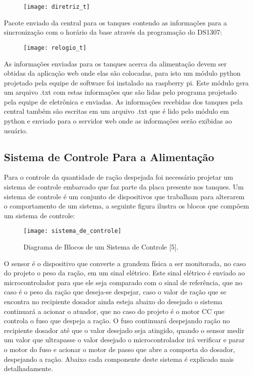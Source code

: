 \begin{figure}[!h]
\centering \texttt{[image: diretriz\_t]}
\label{diretriz_t}
\end{figure}

Pacote enviado da central para os tanques contendo as informações para a sincronização com o horário da base através da programação do DS1307:

\begin{figure}[!h]
\centering \texttt{[image: relogio\_t]}
\label{relogio_t}
\end{figure}

As informações enviadas para os tanques acerca da alimentação devem ser obtidas da aplicação web onde elas são colocadas, para isto um módulo python projetado pela equipe de software foi instalado na raspberry pi. Este módulo gera um arquivo .txt com estas informações que são lidas pelo programa projetado pela equipe de eletrônica e enviadas. As informações recebidas dos tanques pela central também são escritas em um arquivo .txt que é lido pelo módulo em python e enviado para o servidor web onde as informações serão exibidas ao usuário.

\subsection{Sistema de Controle Para a Alimentação}

Para o controle da quantidade de ração despejada foi necessário projetar um sistema de controle embarcado que faz parte da placa presente nos tanques. Um sistema de controle é um conjunto de dispositivos que trabalham para alterarem o comportamento de um sistema, a seguinte figura ilustra os blocos que compõem um sistema de controle:

\begin{figure}[!h]
\centering \texttt{[image: sistema\_de\_controle]}
\caption{Diagrama de Blocos de um Sistema de Controle [5].}
\label{blocoscontrole}
\end{figure}

O sensor é o dispositivo que converte a grandeza física a ser monitorada, no caso do projeto o peso da ração, em um sinal elétrico. Este sinal elétrico é enviado ao microcontrolador para que ele seja comparado com o sinal de referência, que no caso é o peso da ração que deseja-se despejar, caso o valor de ração que se encontra no recipiente dosador ainda esteja abaixo do desejado o sistema continuará a acionar o atuador, que no caso do projeto é o motor CC que controla o fuso que despeja a ração. O fuso continuará despejando ração no recipiente dosador até que o valor desejado seja atingido, quando o sensor medir um valor que ultrapasse o valor desejado o microcontrolador irá verificar e parar o motor do fuso e acionar o motor de passo que abre a comporta do dosador, despejando a ração. Abaixo cada componente deste sistema é explicado mais detalhadamente.

